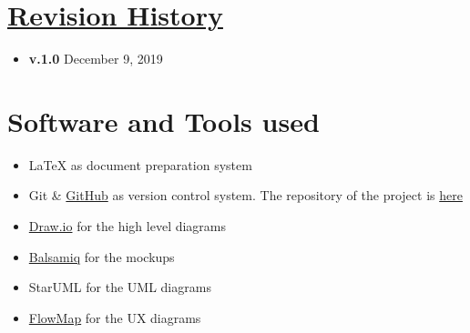 \begin{appendices}
	\section[Revision History]{\hyperlink{toc}{Revision History}}
		\label{sec:revisionHistory}
		
		\begin{itemize}
			\item \textbf{v.1.0} December 9, 2019
		\end{itemize}
		
	\section{Software and Tools used}
		\label{sec:softwareAndTools}
		
		\begin{itemize}
			\item \LaTeX{} as document preparation system
			\item Git \& \href{https://github.com/}{GitHub} as version control system. The repository of the project is \href{https://github.com/Megapiro/PaccianiPiro}{here}
			\item \href{https://www.draw.io/}{Draw.io} for the high level diagrams
			\item \href{https://balsamiq.com/}{Balsamiq} for the mockups
			\item StarUML for the UML diagrams
			\item \href{https://flowmapp.com/}{FlowMap} for the UX diagrams
		\end{itemize}		
\end{appendices}